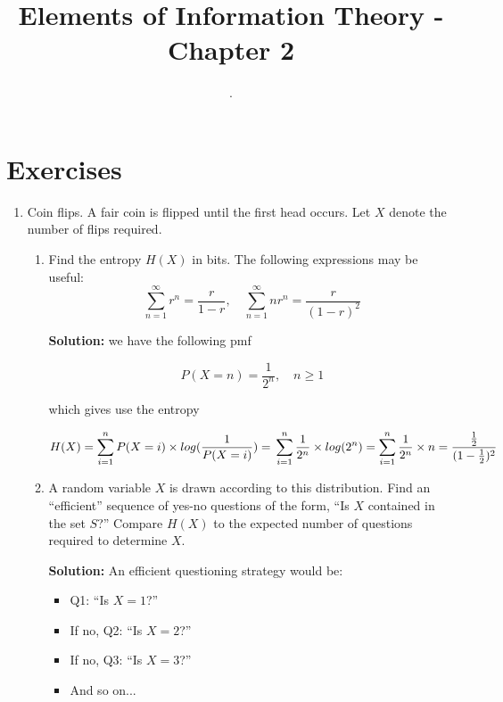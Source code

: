 \documentclass{article}
\title{Elements of Information Theory - Chapter 2}
\begin{document}
\author{.}
\maketitle

\cite{shannon1948}

\section{Exercises}

\begin{enumerate}
    \item Coin flips. A fair coin is flipped until the first head occurs. Let $X$ denote the number of flips required.
    \begin{enumerate}
        \item Find the entropy $H(X)$ in bits. The following expressions may be useful:
        \[
            \sum_{n=1}^{\infty} r^n = \frac{r}{1-r}, \quad \sum_{n=1}^{\infty} nr^n = \frac{r}{(1-r)^2}
        \]

        \textbf{Solution:}
        we have the following pmf 

        \[
            P(X = n) = \frac{1}{2^n}, \quad n \geq 1
        \]

        which gives use the entropy

        \[
        H(X) = \sum_{i=1}^{n} P(X=i) \times log(\frac{1}{P(X=i)}) = \\
        \sum_{i=1}^{n} \frac{1}{2^n} \times log(2^n) = \sum_{i=1}^{n} \frac{1}{2^n} \times n =  \frac{\frac{1}{2}}{(1-\frac{1}{2})^2} 
        \]

        
        \item A random variable $X$ is drawn according to this distribution. Find an ``efficient'' sequence of yes-no questions of the form, ``Is $X$ contained in the set $S$?'' Compare $H(X)$ to the expected number of questions required to determine $X$.
        
        \textbf{Solution:} An efficient questioning strategy would be:
        \begin{itemize}
            \item Q1: ``Is $X = 1$?''
            \item If no, Q2: ``Is $X = 2$?''
            \item If no, Q3: ``Is $X = 3$?''
            \item And so on...
        \end{itemize}
        

\end{enumerate}
\end{enumerate}
\end{document}
